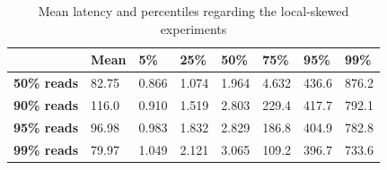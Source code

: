 \begin{table}[!htb]
  \centering
  \begin{tabular}{l l l l l l l l}
    \hline
    & \textbf{Mean} & \textbf{5\%} & \textbf{25\%} & \textbf{50\%} & \textbf{75\%} & \textbf{95\%}& \textbf{99\%} \\
    \hline
    \textbf{50\% reads} & 82.75 & 0.866 & 1.074 & 1.964 & 4.632 & 436.6 & 876.2 \\
    \textbf{90\% reads} & 116.0 & 0.910 & 1.519 & 2.803 & 229.4 & 417.7 & 792.1 \\
    \textbf{95\% reads} & 96.98 & 0.983 & 1.832 & 2.829 & 186.8 & 404.9 & 782.8 \\
    \textbf{99\% reads} & 79.97 & 1.049 & 2.121 & 3.065 & 109.2 & 396.7 &  733.6 \\
    \hline
  \end{tabular}
  \caption{Mean latency and percentiles regarding the local-skewed experiments}\label{tab:local-latencies-table}
\end{table}

